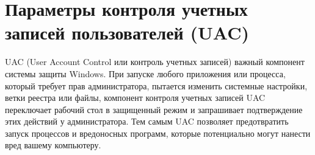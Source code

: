 \documentclass[a4paper, 14pt]{report}
\begin{document}
\section{Параметры контроля учетных записей пользователей (UAC)}
UAC (User Account Control или контроль учетных записей) важный компонент системы защиты Windows. При запуске любого приложения или процесса, который требует прав администратора, пытается изменить системные настройки, ветки реестра или файлы, компонент контроля учетных записей UAC переключает рабочий стол в защищенный режим и запрашивает подтверждение этих действий у администратора. Тем самым UAC позволяет предотвратить запуск процессов и вредоносных программ, которые потенциально могут нанести вред вашему компьютеру.

\end{document}
